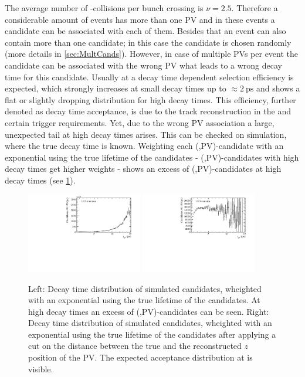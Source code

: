 The average number of \proton\proton-collisions per bunch crossing is $\nu=2.5$.
Therefore a considerable amount of events has more than one \ac{PV} and in these events a \Bz candidate can be associated with each of them.
Besides that an event can also contain more than one \Bz candidate; in this case the \Bz candidate is chosen randomly (more details in \cref{sec:MultCands}).
However, in case of multiple \ac{PV}s per event the \Bz candidate can be associated with the wrong PV what leads to a wrong decay time for this candidate.
Usually at \lhcb a decay time dependent selection efficiency is expected, which strongly increases at small decay times up to $\approx\SI{2}{\pico\second}$ and shows a flat or slightly dropping distribution for high decay times.
This efficiency, further denoted as decay time acceptance, is due to the track reconstruction in the \velo and certain trigger requirements.
Yet, due to the wrong \ac{PV} association a large, unexpected tail at high decay times arises.
This can be checked on simulation, where the true decay time is known.
Weighting each (\Bz,\ac{PV})-candidate with an exponential using the true lifetime of the \Bz candidates - \ie (\Bz,\ac{PV})-candidates with high decay times get higher weights - shows an excess of (\Bz,\ac{PV})-candidates at high decay times (see \cref{fig:WrongPVMC}).
\begin{figure}[tbp]
    \centering
    \includegraphics[width=0.45\textwidth]{06selection/figs/WrongPVs-weightedBad.pdf}
    \includegraphics[width=0.45\textwidth]{06selection/figs/WrongPVs-weightedGoodMC.pdf}
    \caption{Left: Decay time distribution of simulated \BdToDpi candidates, wheighted with an exponential using the true lifetime of the \Bz candidates.
    At high decay times an excess of (\Bz,\ac{PV})-candidates can be seen.
    Right: Decay time distribution of simulated \BdToDpi candidates, wheighted with an exponential using the true lifetime of the \Bz candidates after applying a cut on the distance between the true and the reconstructed $z$ position of the \ac{PV}.
    The expected acceptance distribution at \lhcb is visible.}
    \label{fig:WrongPVMC}
\end{figure}
